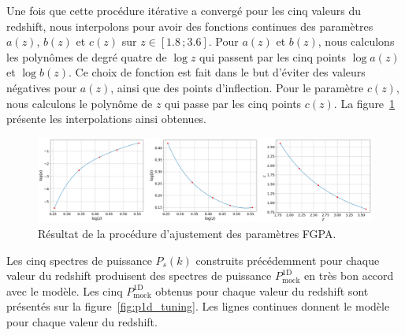 Une fois que cette procédure itérative a convergé pour les cinq valeurs du redshift, nous interpolons pour avoir des fonctions continues des paramètres $a(z)$, $b(z)$ et $c(z)$ sur $z \in [\num{1.8} \, ; \num{3.6}]$. Pour $a(z)$ et $b(z)$, nous calculons les polynômes de degré quatre de $\log z$ qui passent par les cinq points $\log a(z)$ et $\log b(z)$. Ce choix de fonction est fait dans le but d'éviter des valeurs négatives pour $a(z)$, ainsi que des points d'inflection. Pour le paramètre $c(z)$, nous calculons le polynôme de $z$ qui passe par les cinq points $c(z)$.
La figure~\ref{fig:params} présente les interpolations ainsi obtenues.
\begin{figure}
  \centering
  \includegraphics[scale=0.4]{params}
  \caption{Résultat de la procédure d'ajustement des paramètres FGPA.}
  \label{fig:params}
\end{figure}
Les cinq spectres de puissance $P_{s}(k)$ construits précédemment pour chaque valeur du redshift produisent des spectres de puissance $P^{\mathrm{1D}}_{\mathrm{mock}}$ en très bon accord avec le modèle. Les cinq $P^{\mathrm{1D}}_{\mathrm{mock}}$ obtenus pour chaque valeur du redshift sont présentés sur la figure~\ref{fig:p1d_tuning}. Les lignes continues donnent le modèle pour chaque valeur du redshift.
